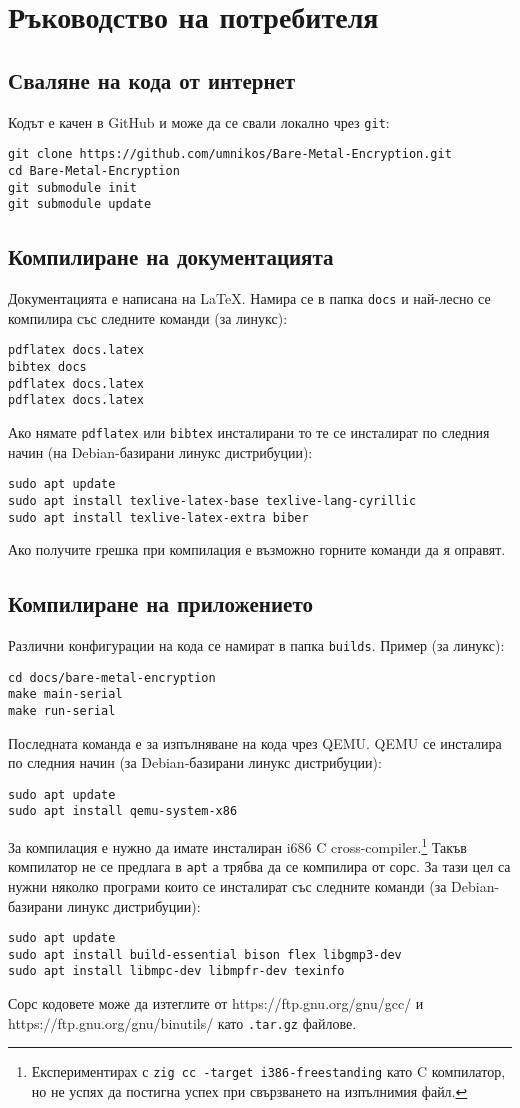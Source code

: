 \section{Ръководство на потребителя}
\subsection{Сваляне на кода от интернет}
Кодът е качен в GitHub и може да се свали локално чрез {\tt git}:
\begin{lstlisting}
git clone https://github.com/umnikos/Bare-Metal-Encryption.git
cd Bare-Metal-Encryption
git submodule init
git submodule update
\end{lstlisting}

\subsection{Компилиране на документацията}
Документацията е написана на \LaTeX{}. Намира се в папка {\tt docs} и най-лесно се компилира със следните команди (за линукс):
\begin{lstlisting}
pdflatex docs.latex
bibtex docs
pdflatex docs.latex
pdflatex docs.latex
\end{lstlisting}
Ако нямате {\tt pdflatex} или {\tt bibtex} инсталирани то те се инсталират по следния начин (на Debian-базирани линукс дистрибуции):
\begin{lstlisting}
sudo apt update
sudo apt install texlive-latex-base texlive-lang-cyrillic
sudo apt install texlive-latex-extra biber
\end{lstlisting}
Ако получите грешка при компилация е възможно горните команди да я оправят.

\subsection{Компилиране на приложението}
Различни конфигурации на кода се намират в папка {\tt builds}. Пример (за линукс):
\begin{lstlisting}
cd docs/bare-metal-encryption
make main-serial
make run-serial
\end{lstlisting}
Последната команда е за изпълняване на кода чрез QEMU. QEMU се инсталира по следния начин (за Debian-базирани линукс дистрибуции):
\begin{lstlisting}
sudo apt update
sudo apt install qemu-system-x86
\end{lstlisting}

За компилация е нужно да имате инсталиран i686 C cross-compiler.\footnote{Експериментирах с {\tt zig cc -target i386-freestanding} като C компилатор, но не успях да постигна успех при свързването на изпълнимия файл.} Такъв компилатор не се предлага в {\tt apt} а трябва да се компилира от сорс. За тази цел са нужни няколко програми които се инсталират със следните команди (за Debian-базирани линукс дистрибуции):
\begin{lstlisting}
sudo apt update
sudo apt install build-essential bison flex libgmp3-dev
sudo apt install libmpc-dev libmpfr-dev texinfo
\end{lstlisting}
Сорс кодовете може да изтеглите от https://ftp.gnu.org/gnu/gcc/ и https://ftp.gnu.org/gnu/binutils/ като {\tt .tar.gz} файлове.

